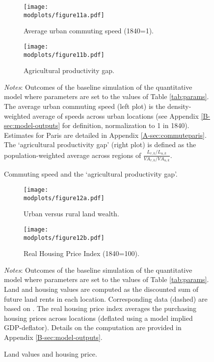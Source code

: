 \documentclass[./20250130-paper.tex]{subfiles}
\begin{document}
\begin{figure}[h!]
	\begin{adjustbox}{center}	
		\begin{subfigure}{\ptwo\textwidth}
			\texttt{[image: \\modplots/figure11a.pdf]}
			\caption{Average urban commuting speed (1840=1).\label{fig:model-speed}}
		\end{subfigure}
		\hspace{0.1cm}
		\begin{subfigure}{\ptwo\textwidth}
			\texttt{[image: \\modplots/figure11b.pdf]}
			\caption{Agricultural productivity gap.\label{fig:model-agp}}
		\end{subfigure}	
	\end{adjustbox}		
	\caption{Commuting speed and the `agricultural productivity gap'.\label{fig:model-commuting}}
	{\footnotesize \textit{Notes}: Outcomes of the baseline simulation of the quantitative model where parameters are set to the values of Table \ref{tab:params}. The average urban commuting speed (left plot) is the density-weighted average of speeds across urban locations (see Appendix \ref{B-sec:model-outputs} for definition, normalization to 1 in 1840). Estimates for Paris are detailed in Appendix \ref{A-sec:commuteparis}. The `agricultural productivity gap' (right plot) is defined as the population-weighted average across regions of $\frac{L_{r,k}/L_{u,k}}{VA_{r,k}/VA_{u,k}}$.}
\end{figure}

\begin{figure}[h!]
	\begin{adjustbox}{center}	
		\begin{subfigure}{\ptwo\textwidth}
			\texttt{[image: \\modplots/figure12a.pdf]}
			\caption{Urban versus rural land wealth.\label{fig:model-piketty}}
		\end{subfigure}
		\hspace{0.1cm}
		\begin{subfigure}{\ptwo\textwidth}
			\texttt{[image: \\modplots/figure12b.pdf]}
			\caption{Real Housing Price Index (1840=100).\label{fig:model-housingprice}}
		\end{subfigure}	
	\end{adjustbox}		
	\caption{Land values and housing price.\label{fig:model-landvalues}}	%
	{\footnotesize \textit{Notes}: Outcomes of the baseline simulation of the quantitative model where parameters are set to the values of Table \ref{tab:params}. Land and housing values are computed as the discounted sum of future land rents in each location. Corresponding data (dashed) are based on \cite{piketty2014capital}. The real housing price index averages the purchasing housing prices across locations (deflated using a model implied GDP-deflator). Details on the computation are provided in Appendix \ref{B-sec:model-outputs}.}
\end{figure}
\end{document}
